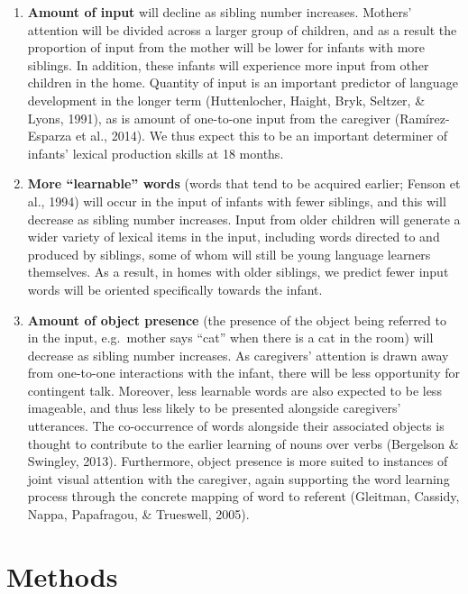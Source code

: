 \documentclass[
  english,
  man,floatsintext]{apa6}
\begin{document}
\begin{enumerate}
\def\labelenumi{\arabic{enumi})}
\item
  \textbf{Amount of input} will decline as sibling number increases. Mothers' attention will be divided across a larger group of children, and as a result the proportion of input from the mother will be lower for infants with more siblings. In addition, these infants will experience more input from other children in the home. Quantity of input is an important predictor of language development in the longer term (Huttenlocher, Haight, Bryk, Seltzer, \& Lyons, 1991), as is amount of one-to-one input from the caregiver (Ramírez-Esparza et al., 2014). We thus expect this to be an important determiner of infants' lexical production skills at 18 months.
\item
  \textbf{More \enquote{learnable} words} (words that tend to be acquired earlier; Fenson et al., 1994) will occur in the input of infants with fewer siblings, and this will decrease as sibling number increases. Input from older children will generate a wider variety of lexical items in the input, including words directed to and produced by siblings, some of whom will still be young language learners themselves. As a result, in homes with older siblings, we predict fewer input words will be oriented specifically towards the infant.
\item
  \textbf{Amount of object presence} (the presence of the object being referred to in the input, e.g.~mother says \enquote{cat} when there is a cat in the room) will decrease as sibling number increases. As caregivers' attention is drawn away from one-to-one interactions with the infant, there will be less opportunity for contingent talk. Moreover, less learnable words are also expected to be less imageable, and thus less likely to be presented alongside caregivers' utterances. The co-occurrence of words alongside their associated objects is thought to contribute to the earlier learning of nouns over verbs (Bergelson \& Swingley, 2013). Furthermore, object presence is more suited to instances of joint visual attention with the caregiver, again supporting the word learning process through the concrete mapping of word to referent (Gleitman, Cassidy, Nappa, Papafragou, \& Trueswell, 2005).
\end{enumerate}

\hypertarget{methods}{%
\section{Methods}\label{methods}}
\end{document}
